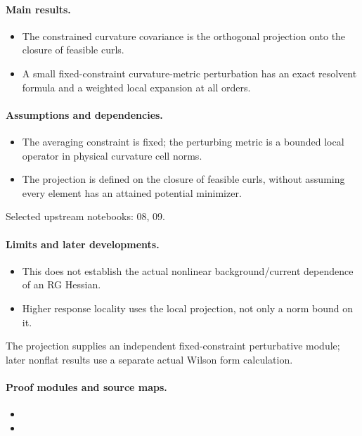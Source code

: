 \paragraph{Main results.}
\begin{itemize}
\item The constrained curvature covariance is the orthogonal projection onto the closure of feasible curls.
\item A small fixed-constraint curvature-metric perturbation has an exact resolvent formula and a weighted local expansion at all orders.
\end{itemize}

\paragraph{Assumptions and dependencies.}
\begin{itemize}
\item The averaging constraint is fixed; the perturbing metric is a bounded local operator in physical curvature cell norms.
\item The projection is defined on the closure of feasible curls, without assuming every element has an attained potential minimizer.
\end{itemize}

Selected upstream notebooks: 08, 09.\par

\paragraph{Limits and later developments.}
\begin{itemize}
\item This does not establish the actual nonlinear background/current dependence of an RG Hessian.
\item Higher response locality uses the local projection, not only a norm bound on it.
\end{itemize}

The projection supplies an independent fixed-constraint perturbative module; later nonflat results use a separate actual Wilson form calculation.

\paragraph{Proof modules and source maps.}
\begingroup\small
\begin{itemize}
\item {}
\item {}
\end{itemize}
\endgroup

